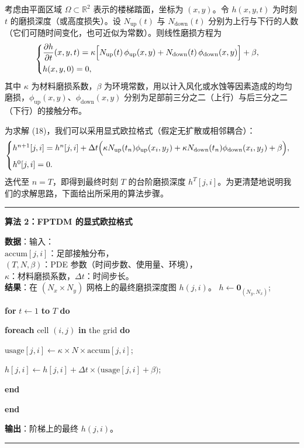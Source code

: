 \documentclass[11pt,a4paper,fontset=windows]{ctexart}
\newcommand{\R}{\mathbb{R}}
\newenvironment{algo}[1]
 {\par\medskip\noindent\rule{\linewidth}{0.5pt}\par\nobreak\vspace{3pt}%
  \noindent\textbf{#1}\par\nobreak\vspace{2pt}%
  \begingroup\small\setlength{\parindent}{0pt}\setlength{\parskip}{2.2pt}\raggedright}
 {\par\endgroup\vspace{2pt}\noindent\rule{\linewidth}{0.5pt}\par\medskip}
\newcommand{\algL}[3][0em]{\noindent\hspace*{#1}\makebox[1.7em][r]{\scriptsize #2}\hspace{0.5em}#3\par}
\begin{document}
考虑由平面区域 $\Omega\subset\R^2$ 表示的楼梯踏面，坐标为 $(x,y)$。令 $h(x,y,t)$ 为时刻 $t$ 的磨损深度（或高度损失）。设 $N_{\text{up}}(t)$ 与 $N_{\text{down}}(t)$ 分别为上行与下行的人数（它们可随时间变化，也可近似为常数）。则线性磨损方程为
\begin{equation}
\begin{cases}
\dfrac{\partial h}{\partial t}(x,y,t)=\kappa\Bigl[N_{\text{up}}(t)\,\phi_{\text{up}}(x,y)+N_{\text{down}}(t)\,\phi_{\text{down}}(x,y)\Bigr]+\beta,\\[6pt]
h(x,y,0)=0,
\end{cases}
\end{equation}
其中 $\kappa$ 为材料磨损系数，$\beta$ 为环境常数，用以计入风化或水蚀等因素造成的均匀磨损，$\phi_{\text{up}}(x,y)$、$\phi_{\text{down}}(x,y)$ 分别为足部前三分之二（上行）与后三分之二（下行）的接触分布。

为求解 (18)，我们可以采用显式欧拉格式（假定无扩散或相邻耦合）：
\begin{equation}
\begin{cases}
h^{n+1}[j,i]=h^{n}[j,i]+\Delta t\Bigl(\kappa N_{\text{up}}(t_n)\phi_{\text{up}}(x_i,y_j)
+\kappa N_{\text{down}}(t_n)\phi_{\text{down}}(x_i,y_j)+\beta\Bigr),\\[6pt]
h^{0}[j,i]=0.
\end{cases}
\end{equation}
迭代至 $n=T$，即得到最终时刻 $T$ 的台阶磨损深度 $h^{T}[j,i]$。为更清楚地说明我们的求解思路，下面给出所采用的算法步骤。

\begin{algo}{算法 2：FPTDM 的显式欧拉格式}
\textbf{数据}：输入：\\
\hspace*{3.2em}$\text{accum}[j,i]$：足部接触分布，\\
\hspace*{3.2em}$(T,N,\beta)$：PDE 参数（时间步数、使用量、环境），\\
\hspace*{3.2em}$\kappa$：材料磨损系数，$\Delta t$：时间步长。\\
\textbf{结果}：在 $(N_x\times N_y)$ 网格上的最终磨损深度图 $h(j,i)$。
\algL{1}{$h\leftarrow\mathbf{0}_{(N_y,N_x)}$;}
\algL{2}{\textbf{for} $t\leftarrow1$ \textbf{to} $T$ \textbf{do}}
\algL[1.6em]{3}{\textbf{foreach} cell $(i,j)$ \textbf{in} the grid \textbf{do}}
\algL[3.2em]{4}{$\text{usage}[j,i]\leftarrow\kappa\times N\times\text{accum}[j,i]$;}
\algL[3.2em]{5}{$h[j,i]\leftarrow h[j,i]+\Delta t\times\bigl(\text{usage}[j,i]+\beta\bigr)$;}
\algL[1.6em]{6}{\textbf{end}}
\algL{7}{\textbf{end}}
\algL{8}{\textbf{输出}：阶梯上的最终 $h(j,i)$。}
\end{algo}
\end{document}
